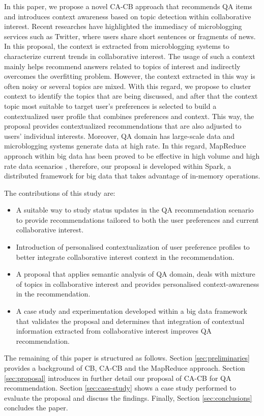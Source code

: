 \documentclass[preprint]{elsarticle}
\begin{document}
\begin{spacing}{1.5}
In this paper, we propose a novel CA-CB approach that recommends QA items and introduces context awareness based on topic detection within collaborative interest. Recent researches \cite{Hermida2010} have highlighted the immediacy of microblogging services such as Twitter, where users share short sentences or fragments of news. In this proposal, the context is extracted from microblogging systems to characterize current trends in collaborative interest. The usage of such a context mainly helps recommend answers related to topics of interest and indirectly overcomes the overfitting problem. However, the context extracted in this way is often noisy or several topics are mixed. With this regard, we propose to cluster context to identify the topics that are being discussed, and after that the context topic most suitable to target user's preferences is selected to build a contextualized user profile that combines preferences and context. This way, the proposal provides contextualized recommendations that are also adjusted to users' individual interests. Moreover, QA domain has large-scale data and microblogging systems generate data at high rate. In this regard, MapReduce approach within big data has been proved to be effective in high volume and high rate data scenarios \cite{Maillo2017,Nair2015}, therefore, our proposal is developed within Spark, a distributed framework for big data that takes advantage of in-memory operations.

The contributions of this study are:
\begin{itemize}
	\item A suitable way to study status updates in the QA recommendation scenario to provide recommendations tailored to both the user preferences and current collaborative interest.
	\item Introduction of personalised contextualization of user preference profiles to better integrate collaborative interest context in the recommendation.
	\item A proposal that applies semantic analysis of QA domain, deals with mixture of topics in collaborative interest and provides personalised context-awareness in the recommendation.
	\item A case study and experimentation developed within a big data framework that validates the proposal and determines that integration of contextual information extracted from collaborative interest improves QA recommendation.
\end{itemize}

The remaining of this paper is structured as follows. Section \ref{sec:preliminaries} provides a background of CB, CA-CB and the MapReduce approach. Section \ref{sec:proposal} introduces in further detail our proposal of CA-CB for QA recommendation. Section \ref{sec:case-study} shows a case study performed to evaluate the proposal and discuss the findings. Finally, Section \ref{sec:conclusions} concludes the paper.


\end{spacing}
\end{document}
